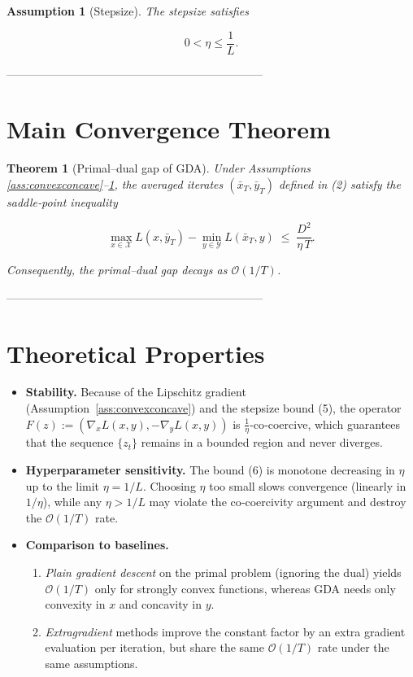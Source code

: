 \documentclass{article}
\newtheorem{theorem}{Theorem}
\newtheorem{assumption}{Assumption}
\begin{document}
\begin{assumption}[Stepsize]\label{ass:stepsize}
The stepsize satisfies  

\[
0<\eta\le \frac{1}{L}.
\tag{5}
\]
\end{assumption}

--------------------------------------------------------------------

\section*{Main Convergence Theorem}
\begin{theorem}[Primal–dual gap of GDA]\label{thm:gap}
Under Assumptions \ref{ass:convexconcave}–\ref{ass:stepsize}, the averaged iterates
\((\bar x_T,\bar y_T)\) defined in (2) satisfy the saddle‑point inequality  

\[
\boxed{
\max_{x\in\mathcal{X}}L(x,\bar y_T)-\min_{y\in\mathcal{Y}}L(\bar x_T,y)
\;\le\; \frac{D^2}{\eta\,T}} .
\tag{6}
\]

Consequently, the primal–dual gap decays as \(\mathcal{O}(1/T)\).
\end{theorem}

--------------------------------------------------------------------

\section*{Theoretical Properties}
\begin{itemize}
\item \textbf{Stability.} Because of the Lipschitz gradient (Assumption~\ref{ass:convexconcave})
and the stepsize bound (5), the operator
\(F(z):=(\nabla_x L(x,y),-\nabla_y L(x,y))\) is \(\frac{1}{\eta}\)-co‑coercive,
which guarantees that the sequence \(\{z_t\}\) remains in a bounded region
and never diverges.

\item \textbf{Hyperparameter sensitivity.} The bound (6) is monotone decreasing in
\(\eta\) up to the limit \(\eta=1/L\). Choosing \(\eta\) too small slows convergence
(linearly in \(1/\eta\)), while any \(\eta>1/L\) may violate the co‑coercivity
argument and destroy the \(\mathcal{O}(1/T)\) rate.

\item \textbf{Comparison to baselines.}
\begin{enumerate}
\item \emph{Plain gradient descent} on the primal problem (ignoring the dual) yields
\(\mathcal{O}(1/T)\) only for strongly convex functions, whereas GDA needs only convexity
in \(x\) and concavity in \(y\).
\item \emph{Extragradient} methods improve the constant factor by an extra gradient
evaluation per iteration, but share the same \(\mathcal{O}(1/T)\) rate under the same
assumptions.
\end{enumerate}
\end{itemize}
\end{document}
